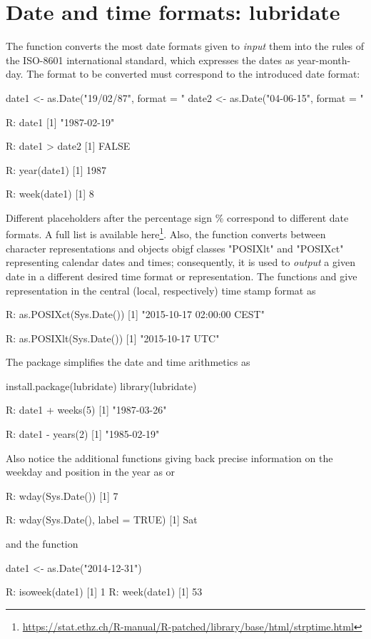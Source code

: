 \section{Date and time formats: lubridate}\label{sec: time}
The function  converts the most
date formats given to \emph{input} them 
into the rules of the ISO-8601 
international standard, which expresses the dates
as year-month-day. The format to be converted 
must correspond to the introduced date format:
\begin{example}
date1 <- as.Date("19/02/87", format = "%
date2 <- as.Date("04-06-15", format = "%

R: date1
[1] "1987-02-19"

R: date1 > date2
[1] FALSE

R: year(date1)
[1] 1987

R: week(date1)
[1] 8
\end{example}

Different placeholders after the percentage sign $\%$
correspond to different date formats. A full list is
available here\footnote{
\url{https://stat.ethz.ch/R-manual/R-patched/library/base/html/strptime.html}}.
Also, the function  converts between character 
representations and objects obigf classes "POSIXlt" 
and "POSIXct" representing calendar dates and times;
consequently, it is used to \emph{output} a given date in a 
different desired time format or representation.
\medskip 
The functions  and 
give representation in the central (local, respectively)
time stamp format as
\begin{example}
R: as.POSIXct(Sys.Date())
[1] "2015-10-17 02:00:00 CEST"

R: as.POSIXlt(Sys.Date())
[1] "2015-10-17 UTC" 
\end{example}
\bigskip

The package  simplifies the date and
time arithmetics as
\begin{example}
install.package(lubridate)
library(lubridate)

R: date1  + weeks(5)
[1] "1987-03-26"

R: date1 - years(2)
[1] "1985-02-19"
\end{example}
Also notice the additional functions giving back
precise information on the weekday and position in
the year as  or 
\begin{example}
R: wday(Sys.Date())
[1] 7

R: wday(Sys.Date(), label = TRUE)
[1] Sat 
\end{example}
and the function 
\begin{example}
date1 <- as.Date("2014-12-31")

R: isoweek(date1)
[1] 1
R: week(date1)
[1] 53
\end{example}
